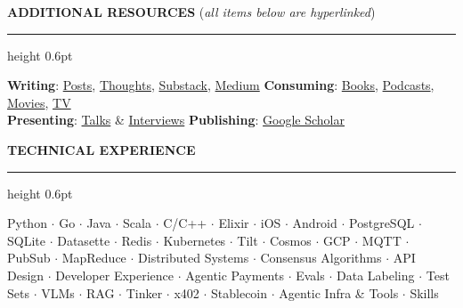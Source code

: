 \documentclass[10pt]{resume}
\newenvironment{rSectionCompact}[1]{
  \medskip
  \vspace{0.45em}
  \textbf{\textcolor{Cerulean}{\MakeUppercase{#1}}}
  \vspace{0.3em}
  {\color{Blue}\hrule height 0.6pt}
  \vspace{0.85em}
  \begin{list}{}{
    \setlength{\leftmargin}{0em}
  }
  \item[]
}{
    \vspace{0.25em}
    \end{list}
}
\begin{document}

\medskip
\vspace{0.25em}
\textbf{\textcolor{Cerulean}{\MakeUppercase{Additional Resources}}} (\textit{\small all items below are hyperlinked})
\vspace{0.2em}
{\color{Blue}\hrule height 0.6pt}
\vspace{0.2em}
\small
\textbf{Writing}: \href{https://olshansky.info/posts}{Posts}, \href{https://olshansky.info/thoughts}{Thoughts}, \href{https://olshansky.substack.com}{Substack}, \href{https://olshansky.medium.com}{Medium} \hfill
\textbf{Consuming}: \href{https://olshansky.info/book}{Books}, \href{https://olshansky.notion.site/768504560fd54cdaa7e24b6c3f31a21e}{Podcasts}, \href{https://olshansky.info/movie}{Movies}, \href{https://olshansky.info/tv}{TV} \\
\textbf{Presenting}: \href{https://www.youtube.com/playlist?list=PLeHvNSh0enXSflgNf-YC6jW6K3Fh4cS5E}{Talks} \& \href{https://www.youtube.com/playlist?list=PLeHvNSh0enXSflgNf-YC6jW6K3Fh4cS5E}{Interviews} \hfill
\textbf{Publishing}: \href{https://scholar.google.com/citations?user=pkPj80UAAAAJ&hl=en&oi=sra}{Google Scholar}


\begin{rSectionCompact}{Technical Experience}
    \small
    Python $\cdot$ Go $\cdot$ Java $\cdot$ Scala $\cdot$ C/C++ $\cdot$ Elixir $\cdot$ iOS $\cdot$ Android $\cdot$ PostgreSQL $\cdot$ SQLite $\cdot$ Datasette $\cdot$ Redis $\cdot$ Kubernetes $\cdot$ Tilt $\cdot$ Cosmos $\cdot$ GCP $\cdot$ MQTT $\cdot$ PubSub $\cdot$ MapReduce $\cdot$ Distributed Systems $\cdot$ Consensus Algorithms $\cdot$ API Design $\cdot$ Developer Experience $\cdot$ Agentic Payments $\cdot$ Evals $\cdot$ Data Labeling $\cdot$ Test Sets $\cdot$ VLMs $\cdot$ RAG $\cdot$ Tinker $\cdot$ x402 $\cdot$ Stablecoin $\cdot$ Agentic Infra \& Tools $\cdot$ Skills
\end{rSectionCompact}
\end{document}

